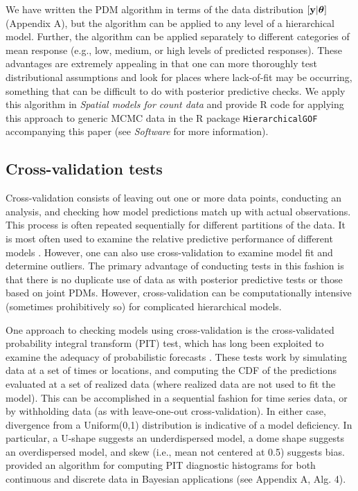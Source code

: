 \documentclass[12pt,english]{article}
\begin{document}
\begin{spacing}{1.9}
We have written the PDM algorithm in terms of the data distribution
$[{\bf y} | \boldsymbol{\theta}]$ (Appendix A), but the algorithm can
be applied to any level of a hierarchical
model. Further, the algorithm can be applied separately to different
categories of mean response (e.g., low, medium, or high levels of
predicted responses). These advantages are extremely appealing in that
one can more thoroughly test distributional assumptions and look for
places where lack-of-fit may be occurring, something that can be
difficult to do with posterior predictive checks.  We apply this
algorithm in \textit{Spatial models for count data} and provide R code for applying this
approach to generic MCMC data in the R package
\texttt{HierarchicalGOF} accompanying this paper (see
\textit{Software} for more information).



\subsection{Cross-validation tests}

Cross-validation consists of leaving out one or more data points,
conducting an analysis, and checking how model predictions match up with
actual observations.  This process is often repeated sequentially for
different partitions of the data.  It is most often used to examine
the relative predictive performance of different models \citep[i.e.,
for model selection; see e.g.][]{ArlotCelisse2010}.  However, one can also use cross-validation to examine model fit and
determine outliers.  The primary advantage of conducting tests in
this fashion is that there is no duplicate use of data as with
posterior predictive tests or those based on joint PDMs. However, cross-validation can be computationally intensive (sometimes prohibitively so) for
complicated hierarchical models.

One approach to checking models using cross-validation is the
cross-validated probability integral transform (PIT) test, which has
long been exploited to examine the adequacy of probabilistic forecasts
\citep[e.g.,][]{Dawid1984,Fruiiwirth1996,GneitingEtAl2007,CzadoEtAl2009}. These
tests work by simulating data at a set of times or locations, and
computing the CDF of the predictions evaluated at a set of realized data
(where realized data are not used to fit the model).  This can be
accomplished in a sequential fashion for time series data, or by
withholding data (as with leave-one-out cross-validation).  In either
case, divergence from a Uniform(0,1) distribution is indicative of a
model deficiency.  In particular, a U-shape suggests an underdispersed
model, a dome shape suggests an overdispersed model, and skew (i.e.,
mean not centered at 0.5) suggests bias.  \citet{Congdon2014} provided
an algorithm for computing PIT diagnostic histograms for both
continuous and discrete data in Bayesian applications (see Appendix A,
Alg. 4).


\end{spacing}
\end{document}
